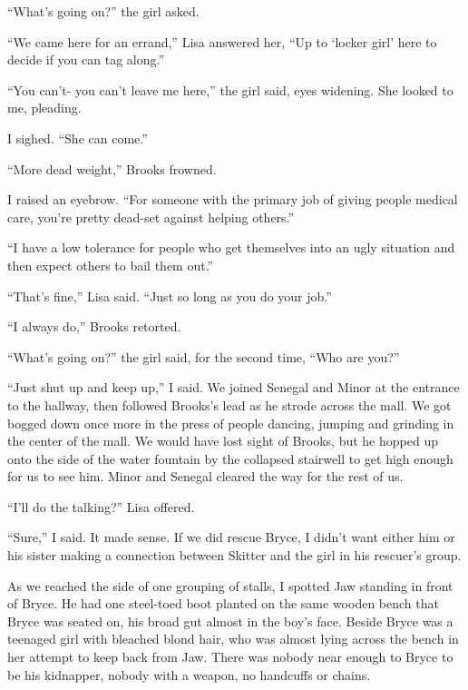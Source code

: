 ``What's going on?''  the girl asked.



``We came here for an errand,'' Lisa answered her, ``Up to `locker girl' here to decide if you can tag along.''



``You can't- you can't leave me here,'' the girl said, eyes widening.  She looked to me, pleading.



I sighed.  ``She can come.''



``More dead weight,'' Brooks frowned.



I raised an eyebrow.  ``For someone with the primary job of giving people medical care, you're pretty dead-set against helping others.''



``I have a low tolerance for people who get themselves into an ugly situation and then expect others to bail them out.''



``That's fine,'' Lisa said.  ``Just so long as you do your job.''



``I always do,'' Brooks retorted.



``What's going on?'' the girl said, for the second time, ``Who are you?''



``Just shut up and keep up,'' I said.  We joined Senegal and Minor at the entrance to the hallway, then followed Brooks's lead as he strode across the mall.  We got bogged down once more in the press of people dancing, jumping and grinding in the center of the mall.  We would have lost sight of Brooks, but he hopped up onto the side of the water fountain by the collapsed stairwell to get high enough for us to see him.  Minor and Senegal cleared the way for the rest of us.



``I'll do the talking?'' Lisa offered.



``Sure,'' I said.  It made sense.  If we did rescue Bryce, I didn't want either him or his sister making a connection between Skitter and the girl in his rescuer's group.



As we reached the side of one grouping of stalls, I spotted Jaw standing in front of Bryce.  He had one steel-toed boot planted on the same wooden bench that Bryce was seated on, his broad gut almost in the boy's face.  Beside Bryce was a teenaged girl with bleached blond hair, who was almost lying across the bench in her attempt to keep back from Jaw.  There was nobody near enough to Bryce to be his kidnapper, nobody with a weapon, no handcuffs or chains.



